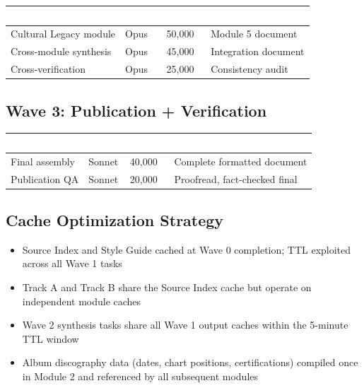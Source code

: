 \documentclass[11pt,letterpaper]{article}
\newcommand{\tableheader}[1]{\textbf{\sffamily\textcolor{white}{#1}}}
\begin{document}
\begin{center}
\begin{tabularx}{\textwidth}{L{3.5cm}C{1.5cm}C{1.5cm}X}
\toprule
{}
\tableheader{Task} & \tableheader{Model} & \tableheader{Tokens} & \tableheader{Output} \\
\midrule
Cultural Legacy module & Opus & 50,000 & Module 5 document \\
Cross-module synthesis & Opus & 45,000 & Integration document \\
Cross-verification & Opus & 25,000 & Consistency audit \\
\bottomrule
\end{tabularx}
\end{center}

\subsection{Wave 3: Publication + Verification}

\begin{center}
\begin{tabularx}{\textwidth}{L{3.5cm}C{1.5cm}C{1.5cm}X}
\toprule
{}
\tableheader{Task} & \tableheader{Model} & \tableheader{Tokens} & \tableheader{Output} \\
\midrule
Final assembly & Sonnet & 40,000 & Complete formatted document \\
Publication QA & Sonnet & 20,000 & Proofread, fact-checked final \\
\bottomrule
\end{tabularx}
\end{center}

\subsection{Cache Optimization Strategy}

\begin{itemize}[leftmargin=2em]
\item Source Index and Style Guide cached at Wave 0 completion; TTL exploited across all Wave 1 tasks
\item Track A and Track B share the Source Index cache but operate on independent module caches
\item Wave 2 synthesis tasks share all Wave 1 output caches within the 5-minute TTL window
\item Album discography data (dates, chart positions, certifications) compiled once in Module 2 and referenced by all subsequent modules
\end{itemize}
\end{document}
